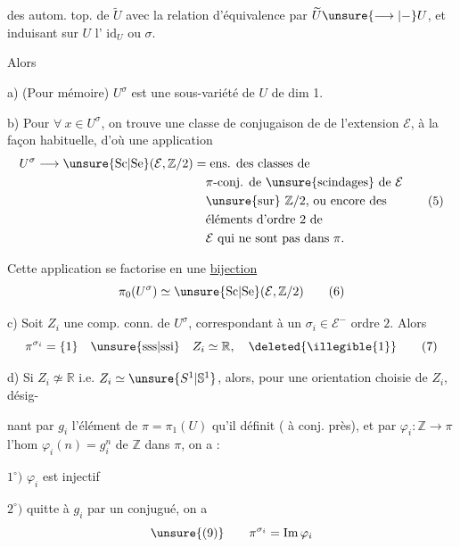 
des autom. top. de $\widetilde U$  avec la
relation d'équivalence  par $\widetilde U\unsure{\longrightarrow|-}U$, et
induisant sur $U$ l' $\mathrm{id}_U$ ou $\sigma$.

 Alors

a) (Pour mémoire) $U^\sigma$ est une sous-variété 
de $U$ de dim 1.

b) Pour $\forall\ x\in U^\sigma$, on trouve une classe
de \inserted{$\pi$-}conjugaison de  de l'extension
$\mathcal E$, à la façon habituelle, d'où une
application
\[
 \begin{aligned}
 U^\sigma\longrightarrow\unsure{\mathrm{Sc}|\mathrm{Se}}(\mathcal E,\mathbb Z/2)
 &=\text{ens. des classes de}\\
 &\quad\text{$\pi$-conj. de \unsure{scindages} de $\mathcal E$}\\
 &\quad\text{\unsure{sur} $\mathbb Z/2$, ou encore des}\\
 &\quad\text{éléments d'ordre $2$ de}\\
 &\quad\text{$\mathcal E$ qui ne sont pas dans $\pi$.}
 \end{aligned}
 \tag{5}
\]

Cette application se factorise en une
\uline{bijection}
\[
 \pi_0(U^\sigma)\simeq\unsure{\mathrm{Sc}|\mathrm{Se}}(\mathcal E,\mathbb Z/2)
 \tag{6}
\]

c) Soit $Z_i$ une comp. conn. de $U^\sigma$,
correspondant à un  $\sigma_i\in\mathcal E^-$ 
ordre $2$. Alors 
\[
 \pi^{\sigma_i}=\{1\}\quad\text{\unsure{sss|ssi}}\quad Z_i\simeq\mathbb R,
 \quad\deleted{\illegible{1}}
 \tag{7}
\]

d) Si $Z_i\not\simeq\mathbb R$ i.e.  $Z_i\simeq\unsure{S^1|\mathbb S^1}$, alors,
pour une orientation choisie de $Z_i$, désig-

nant par $g_i$ l'élément de $\pi=\pi_1(U)$
qu'il définit ( à conj. près), et
par $\varphi_i:\mathbb Z\longrightarrow\pi$ l'hom $\varphi_i(n)=g_i^n$ de
$\mathbb Z$ dans $\pi$, on a :

$1^\circ)$ $\varphi_i$ est injectif

$2^\circ)$ quitte à  $g_i$ par un conjugué,
on a
\[
\unsure{(9)}\qquad \pi^{\sigma_i}=\operatorname{Im}\varphi_i
\]

